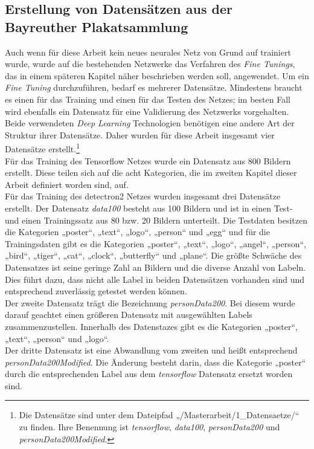 \documentclass[a4paper,12pt,ngerman]{article}
\begin{document}
\subsection{Erstellung von Datensätzen aus der Bayreuther Plakatsammlung}
Auch wenn für diese Arbeit kein neues neurales Netz von Grund auf trainiert wurde, wurde auf die bestehenden Netzwerke das Verfahren des \textit{Fine Tunings}, das in einem späteren Kapitel näher beschrieben werden soll, angewendet. Um ein \textit{Fine Tuning} durchzuführen, bedarf es mehrerer Datensätze. Mindestens braucht es einen für das Training und einen für das Testen des Netzes; im besten Fall wird ebenfalls ein Datensatz für eine Validierung des Netzwerks vorgehalten. \\
Beide verwendeten \textit{Deep Learning} Technologien benötigen eine andere Art der Struktur ihrer Datensätze. Daher wurden für diese Arbeit insgesamt vier Datensätze erstellt.\footnote{Die Datensätze sind unter dem Dateipfad „/Masterarbeit/1\_Datensaetze/“ zu finden. Ihre Benennung ist \textit{tensorflow}, \textit{data100}, \textit{personData200} und \textit{personData200Modified}.} \\
Für das Training des Tensorflow Netzes wurde ein Datensatz aus 800 Bildern erstellt. Diese teilen sich auf die acht Kategorien, die im zweiten Kapitel dieser Arbeit definiert worden sind, auf. \\
Für das Training des detectron2 Netzes wurden insgesamt drei Datensätze erstellt. Der Datensatz \textit{data100} besteht aus 100 Bildern und ist in einen Test- und einen Trainingssatz aus 80 bzw. 20 Bildern unterteilt. Die Testdaten besitzen die Kategorien „poster“, „text“, „logo“, „person“ und „egg“ und für die Trainingsdaten gibt es die Kategorien „poster“, „text“, „logo“, „angel“, „person“, „bird“, „tiger“, „cat“, „clock“, „butterfly“ und „plane“. Die größte Schwäche des Datensatzes ist seine geringe Zahl an Bildern und die diverse Anzahl von Labeln. Dies führt dazu, dass nicht alle Label in beiden Datensätzen vorhanden sind und entsprechend zuverlässig getestet werden können. \\
Der zweite Datensatz trägt die Bezeichnung \textit{personData200}. Bei diesem wurde darauf geachtet einen größeren Datensatz mit ausgewählten Labels zusammenzustellen. Innerhalb des Datenstazes gibt es die Kategorien „poster“, „text“, „person“ und „logo“. \\
Der dritte Datensatz ist eine Abwandlung vom zweiten und heißt entsprechend \textit{personData200Modified}. Die Änderung besteht darin, dass die Kategorie „poster“ durch die entsprechenden Label aus dem \textit{tensorflow} Datensatz ersetzt worden sind. \\
\end{document}
